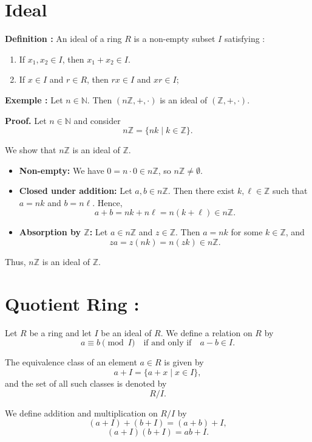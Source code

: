 \section{Ideal}
\textbf{Definition :}
 An ideal of a ring $R$ is a non-empty subset $I$ satisfying :
 \begin{enumerate}
     \item  If $ x_1, x_2\in I$, then $x_1 + x_2 \in I$.
     \item  If $x \in I$ and $r \in R$, then $  rx \in I$ and $xr \in I$;
 \end{enumerate}
 \textbf{Exemple :}
 Let $n \in \mathbb{N}$. Then $(n\mathbb{Z}, +, \cdot)$ is an ideal of $(\mathbb{Z}, +, \cdot)$.

\textbf{Proof.} Let $n \in \mathbb{N}$ and consider
\[
n\mathbb{Z} = \{nk \mid k \in \mathbb{Z}\}.
\]

We show that $n\mathbb{Z}$ is an ideal of $\mathbb{Z}$.

\begin{itemize}
\item \textbf{Non-empty:} We have $0 = n \cdot 0 \in n\mathbb{Z}$, so $n\mathbb{Z} \neq \emptyset$.

\item \textbf{Closed under addition:} Let $a, b \in n\mathbb{Z}$. Then there exist $k, \ell \in \mathbb{Z}$ such that $a = nk$ and $b = n\ell$. Hence,
\[
a + b = nk + n\ell = n(k + \ell) \in n\mathbb{Z}.
\]

\item \textbf{Absorption by $\mathbb{Z}$:} Let $a \in n\mathbb{Z}$ and $z \in \mathbb{Z}$. Then $a = nk$ for some $k \in \mathbb{Z}$, and
\[
za = z(nk) = n(zk) \in n\mathbb{Z}.
\]
\end{itemize}

Thus, $n\mathbb{Z}$ is an ideal of $\mathbb{Z}$. 
\section{Quotient Ring :}
Let $R$ be a ring and let $I$ be an ideal of $R$. We define a relation on $R$ by
\[
a \equiv b \pmod{I} \quad \text{if and only if} \quad a - b \in I.
\]

The equivalence class of an element $a \in R$ is given by
\[
a + I = \{a + x \mid x \in I\},
\]
and the set of all such classes is denoted by
\[
R/I.
\]

We define addition and multiplication on $R/I$ by
\[
(a + I) + (b + I) = (a + b) + I,
\]
\[
(a + I)(b + I) = ab + I.
\]

